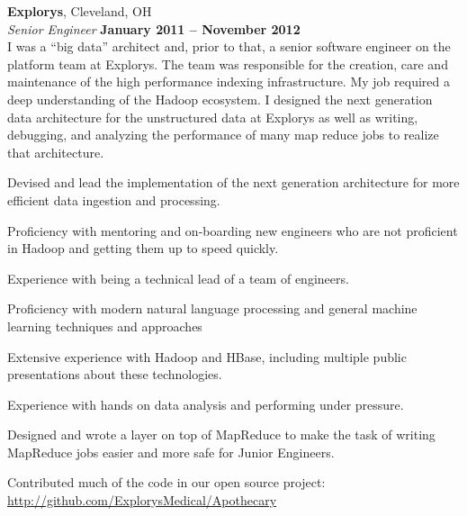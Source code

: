 \documentclass[margin,line,12pt]{resume}
\begin{document}
\begin{resume}
    \textbf{Explorys}, Cleveland, OH \vspace{2mm}\\\vspace{1mm}%
    \textsl{Senior Engineer} \hfill \textbf{January 2011 -- November 2012}\\
    I was a ``big data'' architect and, prior to that, a senior software engineer on the platform team at Explorys. 
    The team was responsible for the creation, care and maintenance of the high performance indexing infrastructure.
    My job required a deep understanding of the Hadoop ecosystem.  I designed the next generation data 
    architecture for the unstructured data at Explorys as well as writing, debugging, and analyzing the 
    performance of many map reduce jobs to realize that architecture.  

    \begin{list2}
    \item  Devised and lead the implementation of the next generation architecture for more efficient data ingestion and processing.
    \item  Proficiency with mentoring and on-boarding new engineers who are not proficient in Hadoop and getting them up to speed quickly.
    \item  Experience with being a technical lead of a team of engineers.
    \item  Proficiency with modern natural language processing and general machine learning techniques and approaches
    \item  Extensive experience with Hadoop and HBase, including multiple public presentations about these technologies.
    \item  Experience with hands on data analysis and performing under pressure.
    \item  Designed and wrote a layer on top of MapReduce to make the task of writing MapReduce jobs easier and more safe for Junior Engineers.
    \item  Contributed much of the code in our open source project: \\\url{http://github.com/ExplorysMedical/Apothecary}
    \end{list2}

    \newpage
    \vspace*{1mm}


\end{resume}
\end{document}
